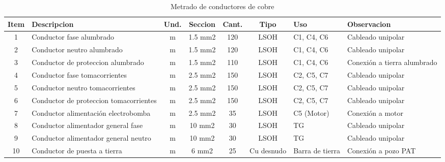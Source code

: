 \begin{table}[H]
\centering
\small
\setlength{\tabcolsep}{4pt}
\caption{Metrado de conductores de cobre}
\label{tab:metrado-conductores}
\begin{tabularx}{\textwidth}{c L{3.5cm} c c c c L{1.8cm} Y}
\toprule
\textbf{Item} & \textbf{Descripcion} & \textbf{Und.} & \textbf{Seccion} & \textbf{Cant.} & \textbf{Tipo} & \textbf{Uso} & \textbf{Observacion} \\
 & Conductor fase alumbrado & m & 1.5 mm2 & 120 & LSOH & C1, C4, C6 & Cableado unipolar \\
2 & Conductor neutro alumbrado & m & 1.5 mm2 & 120 & LSOH & C1, C4, C6 & Cableado unipolar \\
3 & Conductor de proteccion alumbrado & m & 1.5 mm2 & 110 & LSOH & C1, C4, C6 & Conexión a tierra alumbrado \\
4 & Conductor fase tomacorrientes & m & 2.5 mm2 & 150 & LSOH & C2, C5, C7 & Cableado unipolar \\
5 & Conductor neutro tomacorrientes & m & 2.5 mm2 & 150 & LSOH & C2, C5, C7 & Cableado unipolar \\
6 & Conductor de proteccion tomacorrientes & m & 2.5 mm2 & 150 & LSOH & C2, C5, C7 & Cableado unipolar \\
7 & Conductor alimentación electrobomba & m & 2.5 mm2 & 35 & LSOH & C5 (Motor) & Conexión a motor \\
8 & Conductor alimentador general fase & m & 10 mm2 & 30 & LSOH & TG & Cableado unipolar \\
9 & Conductor alimentador general neutro & m & 10 mm2 & 30 & LSOH & TG & Cableado unipolar \\
10 & Conductor de puesta a tierra & m & 6 mm2 & 25 & Cu desnudo & Barra de tierra & Conexión a pozo PAT \\
\bottomrule
\end{tabularx}
\end{table}

